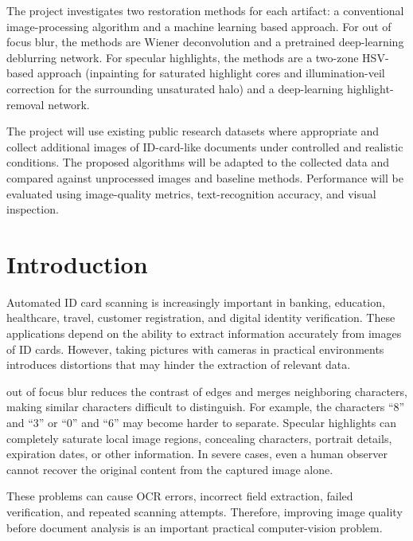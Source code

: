 \documentclass{article}
\begin{document}
The project investigates two restoration methods for each artifact: a conventional image-processing algorithm and a machine learning based approach. For out of focus blur, the methods are Wiener deconvolution and a pretrained deep-learning deblurring network. For specular highlights, the methods are a two-zone HSV-based approach (inpainting for saturated highlight cores and illumination-veil correction for the surrounding unsaturated halo) and a deep-learning highlight-removal network.

The project will use existing public research datasets where appropriate and collect additional images of ID-card-like documents under controlled and realistic conditions. The proposed algorithms will be adapted to the collected data and compared against unprocessed images and baseline methods. Performance will be evaluated using image-quality metrics, text-recognition accuracy, and visual inspection.

\section{Introduction}
\label{sec:intro}
Automated ID card scanning is increasingly important in banking, education, healthcare, travel, customer registration, and digital identity verification. These applications depend on the ability to extract information accurately from images of ID cards. However, taking pictures with cameras in practical environments introduces distortions that may hinder the extraction of relevant data.

out of focus blur reduces the contrast of edges and merges neighboring characters, making similar characters difficult to distinguish. For example, the characters “8” and “3” or “0” and “6” may become harder to separate. Specular highlights can completely saturate local image regions, concealing characters, portrait details, expiration dates, or other information. In severe cases, even a human observer cannot recover the original content from the captured image alone.

These problems can cause OCR errors, incorrect field extraction, failed verification, and repeated scanning attempts. Therefore, improving image quality before document analysis is an important practical computer-vision problem.
\end{document}
